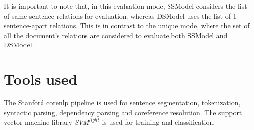 It is important to note that, in this evaluation mode, SSModel considers the list of same-sentence relations for evaluation, whereas DSModel uses the list of 1-sentence-apart relations. This is in contrast to the unique mode, where the set of all the document's relations are considered to evaluate both SSModel and DSModel.

\section{Tools used}\label{sec:tools}

The Stanford corenlp pipeline \cite{manning2014stanford} is used for sentence segmentation, tokenization, syntactic parsing, dependency parsing and coreference resolution. The support vector machine library $SVM^{light}$ \cite{joachims1999making} is used for training and classification.
